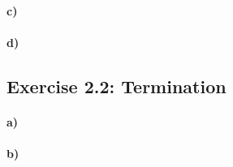 \documentclass[12pt,a4paper]{article}
\begin{document}
\paragraph{c)} %
\paragraph{d)} %

\subsection*{Exercise 2.2: Termination}
\paragraph*{a)} %
\paragraph{b)} %
\end{document}

